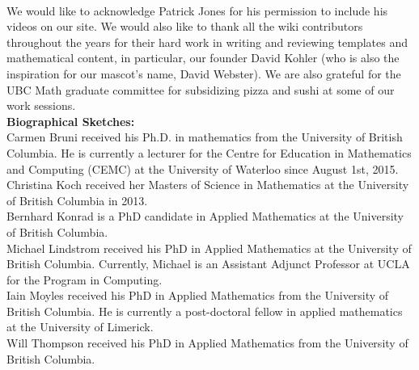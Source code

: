 \documentclass{primus}
\begin{document}
\\[1cm]
\noindent{}We would like to acknowledge Patrick Jones for his permission to include his videos on our site. We would also like to thank all the wiki contributors throughout the years for their hard work in writing and reviewing templates and mathematical content, in particular, our founder David Kohler (who is also the inspiration for our mascot’s name, David Webster). We are also grateful for the UBC Math graduate committee for subsidizing pizza and sushi at some of our work sessions.
\\[1cm]
\textbf{Biographical Sketches:}\\
Carmen Bruni received his Ph.D. in mathematics from the University of British Columbia. He is currently a lecturer for the Centre for Education in Mathematics and Computing (CEMC) at the University of Waterloo since August 1st, 2015. 
\\[0.5cm]
Christina Koch received her Masters of Science in Mathematics at the University of British Columbia in 2013. 
\\[0.5cm]
Bernhard Konrad is a PhD candidate in Applied Mathematics at the University of British Columbia.
\\[0.5cm]
Michael Lindstrom received his PhD in Applied Mathematics at the University of British Columbia.  Currently, Michael is an Assistant Adjunct Professor at UCLA for the Program in Computing.
\\[0.5cm]
Iain Moyles received his PhD in Applied Mathematics from the University of British Columbia.   He is currently a post-doctoral fellow in applied mathematics at the University of Limerick.
\\[0.5cm]
Will Thompson received his PhD in Applied Mathematics from the University of British Columbia.
\\[0.5cm]
\end{document}
